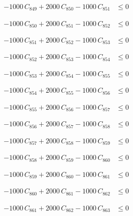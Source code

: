 \documentclass[a4paper,11pt]{article}
\begin{document}
\begin{align}
-1000\,C_{849} + 2000\,C_{850} - 1000\,C_{851} &\leq 0 \nonumber
\end{align}

\begin{align}
-1000\,C_{850} + 2000\,C_{851} - 1000\,C_{852} &\leq 0 \nonumber
\end{align}

\begin{align}
-1000\,C_{851} + 2000\,C_{852} - 1000\,C_{853} &\leq 0 \nonumber
\end{align}

\begin{align}
-1000\,C_{852} + 2000\,C_{853} - 1000\,C_{854} &\leq 0 \nonumber
\end{align}

\begin{align}
-1000\,C_{853} + 2000\,C_{854} - 1000\,C_{855} &\leq 0 \nonumber
\end{align}

\begin{align}
-1000\,C_{854} + 2000\,C_{855} - 1000\,C_{856} &\leq 0 \nonumber
\end{align}

\begin{align}
-1000\,C_{855} + 2000\,C_{856} - 1000\,C_{857} &\leq 0 \nonumber
\end{align}

\begin{align}
-1000\,C_{856} + 2000\,C_{857} - 1000\,C_{858} &\leq 0 \nonumber
\end{align}

\begin{align}
-1000\,C_{857} + 2000\,C_{858} - 1000\,C_{859} &\leq 0 \nonumber
\end{align}

\begin{align}
-1000\,C_{858} + 2000\,C_{859} - 1000\,C_{860} &\leq 0 \nonumber
\end{align}

\begin{align}
-1000\,C_{859} + 2000\,C_{860} - 1000\,C_{861} &\leq 0 \nonumber
\end{align}

\begin{align}
-1000\,C_{860} + 2000\,C_{861} - 1000\,C_{862} &\leq 0 \nonumber
\end{align}

\begin{align}
-1000\,C_{861} + 2000\,C_{862} - 1000\,C_{863} &\leq 0 \nonumber
\end{align}
\end{document}
